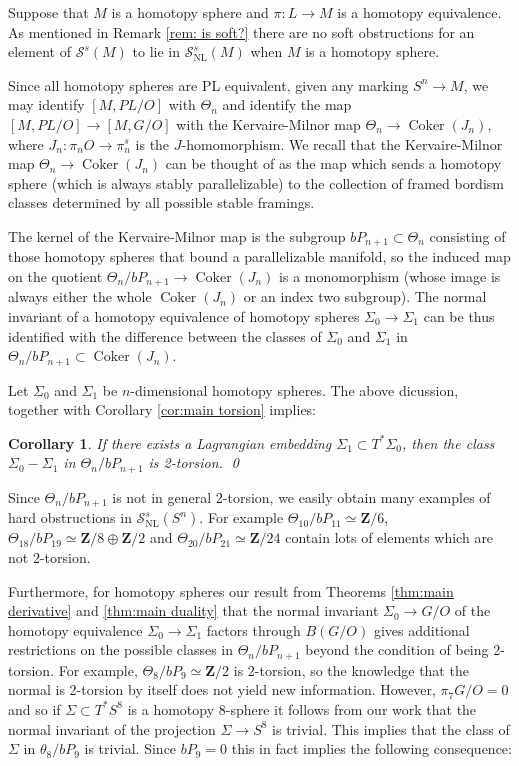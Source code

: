 \documentclass[reqno]{amsart}
\newcommand{\THOMAS}[1]%
	{\begin{quotation}{\footnotesize\textcolor{brown}{\textbf{Thomas:} #1}}\end{quotation}}
\theoremstyle{theorem}
\newtheorem{corollary}{Corollary}[section]
\theoremstyle{remark}
\theoremstyle{definition}
\DeclareMathOperator{\coker}{Coker}
\newcommand{\bZ}{\mathbf{Z}}
\newcommand{\NL}{\mathrm{NL}}
\renewcommand{\SS}{\mathcal{S}}
\begin{document}
Suppose that $M$ is a homotopy sphere and $\pi:L \to M$ is a homotopy equivalence. As mentioned in Remark \ref{rem: is soft?} there are no soft obstructions for an element of $\SS^s(M)$ to lie in $\SS_{\text{NL}}^s(M)$ when $M$ is a homotopy sphere.


Since all homotopy spheres are PL equivalent, given any marking $S^n \to M$, we may identify $[M,PL/O]$ with $\Theta_n$ and identify the map $[M,PL/O] \to [M,G/O]$ with the Kervaire-Milnor map $\Theta_n \to \coker(J_n)$, where $J_n: \pi_nO \to \pi_n^s$ is the $J$-homomorphism. We recall that the Kervaire-Milnor map $\Theta_n \to \coker(J_n)$ can be thought of as the map which sends a homotopy sphere (which is always stably parallelizable) to the collection of framed bordism classes determined by all possible stable framings.




The kernel of the Kervaire-Milnor map is the subgroup $bP_{n+1} \subset \Theta_n$ consisting of those homotopy spheres that bound a parallelizable manifold, so the induced map on the quotient $\Theta_n/bP_{n+1} \to \coker(J_n)$ is a monomorphism (whose image is always either the whole $\coker(J_n)$ or an index two subgroup). The normal invariant of a homotopy equivalence of homotopy spheres $\Sigma_0 \to \Sigma_1$ can be thus identified with the difference between the classes of $\Sigma_0$ and $\Sigma_1$ in $\Theta_n / bP_{n+1} \subset \coker(J_n)$. 


Let $\Sigma_0$ and $\Sigma_1$ be $n$-dimensional homotopy spheres. The above dicussion, together with Corollary \ref{cor:main torsion} implies:
\begin{corollary}
If there exists a Lagrangian embedding $\Sigma_1 \subset T^*\Sigma_0$, then  the class $\Sigma_0-\Sigma_1$ in $\Theta_n/bP_{n+1}$ is 2-torsion. \qed
\end{corollary}

Since $\Theta_n/bP_{n+1}$ is not in general 2-torsion,  we easily obtain many examples of hard obstructions in $\SS^s_\NL(S^n)$. For example $\Theta_{10}/bP_{11}\simeq \bZ/6$, $\Theta_{18}/bP_{19}\simeq \bZ/8 \oplus \bZ/2$ and $\Theta_{20}/bP_{21} \simeq \bZ/24$ contain lots of elements which are not 2-torsion.




Furthermore, for homotopy spheres our result from Theorems \ref{thm:main derivative} and \ref{thm:main duality} that the normal invariant $\Sigma_0 \to G/O$ of the homotopy equivalence $\Sigma_0 \to \Sigma_1$ factors through $B(G/O)$ gives additional restrictions on the possible classes in $\Theta_n/bP_{n+1}$ beyond the condition of being 2-torsion. For example, $\Theta_8/bP_9 \simeq \bZ/2$ is 2-torsion, so the knowledge that the normal is 2-torsion by itself does not yield new information. However, $\pi_7G/O=0$ and so if $\Sigma \subset T^*S^8$ is a homotopy 8-sphere it follows from our work that the normal invariant of the projection $\Sigma \to S^8$ is trivial. This implies that the class of $\Sigma$ in $\theta_8/bP_9$ is trivial. Since $bP_9=0$ this in fact implies the following consequence:
\end{document}

